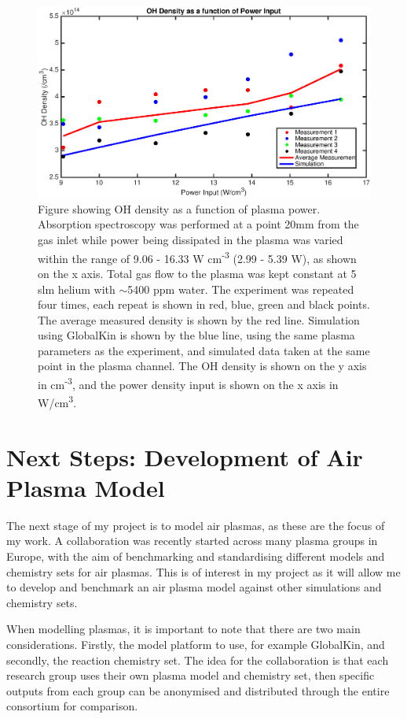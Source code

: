 \documentclass[11pt, oneside]{article}   	%
\begin{document}
\begin{figure}
\includegraphics[width=\textwidth]{Figures/PowerVariation}
\caption{Figure showing OH density as a function of plasma power. Absorption spectroscopy was performed at a point 20mm from the gas inlet while power being dissipated in the plasma was varied within the range of 9.06 - 16.33 W cm\textsuperscript{-3} (2.99 - 5.39 W), as shown on the x axis. Total gas flow to the plasma was kept constant at 5 slm helium with $\sim$5400 ppm water. The experiment was repeated four times, each repeat is shown in red, blue, green and black points. The average measured density is shown by the red line.
Simulation using GlobalKin is shown by the blue line, using the same plasma parameters as the experiment, and simulated data taken at the same point in the plasma channel.
The OH density is shown on the y axis in cm\textsuperscript{-3}, and the power density input is shown on the x axis in W/cm\textsuperscript{3}.}
\label{PowerVariation}
\end{figure}


\section{Next Steps: Development of Air Plasma Model}

The next stage of my project is to model air plasmas, as these are the focus of my work.
A collaboration was recently started across many plasma groups in Europe, with the aim of benchmarking and standardising different models and chemistry sets for air plasmas.
This is of interest in my project as it will allow me to develop and benchmark an air plasma model against other simulations and chemistry sets.

When modelling plasmas, it is important to note that there are two main considerations.
Firstly, the model platform to use, for example GlobalKin, and secondly, the reaction chemistry set.
The idea for the collaboration is that each research group uses their own plasma model and chemistry set, then specific outputs from each group can be anonymised and distributed through the entire consortium for comparison.
\end{document}
